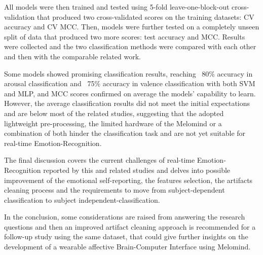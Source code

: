All models were then trained and tested using 5-fold leave-one-block-out cross-validation that produced two cross-validated scores on the training datasets: CV accuracy and CV MCC. Then, models were further tested on a completely unseen split of data that produced two more scores: test accuracy and MCC. Results were collected and the two classification methods were compared with each other and then with the comparable related work. 

Some models showed promising classification results, reaching ~80\% accuracy in arousal classification and ~75\% accuracy in valence classification with both SVM and MLP, and MCC scores confirmed on average the models' capability to learn. However, the average classification results did not meet the initial expectations and are below most of the related studies, suggesting that the adopted lightweight pre-processing, the limited hardware of the Melomind or a combination of both hinder the classification task and are not yet suitable for real-time Emotion-Recognition.

The final discussion covers the current challenges of real-time Emotion-Recognition reported by this and related studies and delves into possible improvement of the emotional self-reporting, the features selection, the artifacts cleaning process and the requirements to move from subject-dependent classification to subject independent-classification.

In the conclusion, some considerations are raised from answering the research questions and then an improved artifact cleaning approach is recommended for a follow-up study using the same dataset, that could give further insights on the development of a wearable affective Brain-Computer Interface using Melomind.
